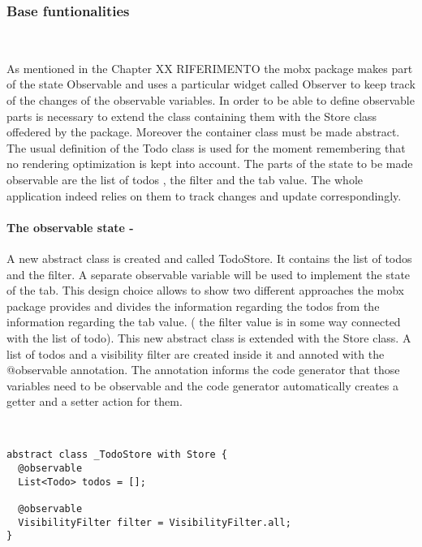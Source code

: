 \subsubsection{Base funtionalities} \mbox{}\\ \label{par:todo_app_inherited_widget_introduction} 
 
As mentioned in the Chapter XX RIFERIMENTO the mobx package makes part of the state Observable and uses a particular widget called Observer to keep track of the changes of the observable variables. In order to be able to define observable parts is necessary to extend the class containing them with the Store class offedered by the package. Moreover the container class must be made abstract. The usual definition of the Todo class is used for the moment remembering that no rendering optimization is kept into account. The parts of the state to be made observable are the list of todos , the filter and the tab value. The whole application indeed relies on them to track changes and update correspondingly. 
\paragraph{The observable state - }
\label{subpar:todo_app_bloc_core_state} A new abstract class is created and called TodoStore. It contains the list of todos and the filter. A separate observable variable will be used to implement the state of the tab. This design choice allows to show two different approaches the mobx package provides and divides the information regarding the todos from the information regarding the tab value. ( the filter value is in some way connected with the list of todo). This new abstract class is extended with the Store class. A list of todos and a visibility filter are created inside it and annoted with the @observable annotation. The annotation informs the code generator that those variables need to be observable and the code generator automatically creates a getter and a setter action for them. 
\begin{code}
\mbox{}\\
 \mbox{}
		\label{code:2.14}
\begin{verbatim}
abstract class _TodoStore with Store {
  @observable
  List<Todo> todos = [];

  @observable
  VisibilityFilter filter = VisibilityFilter.all;
}
\end{verbatim}
\mbox{}
\end{code}

